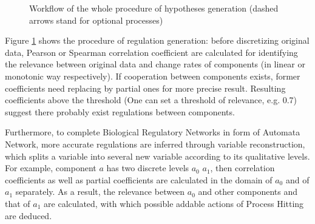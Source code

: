 \begin{figure}[ht]
\centering
{}
\caption[Workflow of model inference via partial correlation]{Workflow of the whole procedure of hypotheses generation (dashed arrows stand for optional processes)}\label{plan}
\end{figure}
Figure \ref{plan} shows the procedure of regulation generation: before discretizing original data, Pearson or Spearman correlation coefficient \cite{samaga2009logic,hauke2011comparison} are calculated for identifying the relevance between original data and change rates of components (in linear or monotonic way respectively). If cooperation between components exists, former coefficients need replacing by partial ones \cite{de2004discovery} for more precise result.
Resulting coefficients above the threshold (One can set a threshold of relevance, e.g. 0.7) suggest there probably exist regulations between components.

Furthermore, to complete Biological Regulatory Networks in form of Automata Network, more accurate regulations are inferred through variable reconstruction, which splits a variable into several new variable according to its qualitative levels.
For example, component $a$ has two discrete levels $a_0$ $a_1$, then correlation coefficients as well as partial coefficients are calculated in the domain of $a_0$ and of $a_1$ separately.
As a result, the relevance between $a_0$ and other components and that of $a_1$ are calculated, with which possible addable actions of Process Hitting are deduced.

